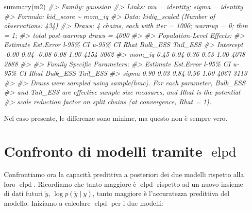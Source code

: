 \documentclass[
  10pt,
  italian,
  a4paper,
  extrafontsizes,onecolumn,openright
  ]{memoir}
\newenvironment{Shaded}{\begin{snugshade}}{\end{snugshade}}
\newcommand{\CommentTok}[1]{\textcolor[rgb]{0.56,0.35,0.01}{\textit{#1}}}
\newcommand{\FunctionTok}[1]{\textcolor[rgb]{0.00,0.00,0.00}{#1}}
\newcommand{\NormalTok}[1]{#1}
\DeclareMathOperator{\elpd}{elpd} %
\theoremstyle{definition}
\theoremstyle{definition}
\theoremstyle{definition}
\theoremstyle{definition}
\theoremstyle{remark}
\begin{document}
\begin{Shaded}
\begin{Highlighting}[]
\FunctionTok{summary}\NormalTok{(m2)}
\CommentTok{\#\textgreater{}  Family: gaussian }
\CommentTok{\#\textgreater{}   Links: mu = identity; sigma = identity }
\CommentTok{\#\textgreater{} Formula: kid\_score \textasciitilde{} mom\_iq }
\CommentTok{\#\textgreater{}    Data: kidiq\_scaled (Number of observations: 434) }
\CommentTok{\#\textgreater{}   Draws: 4 chains, each with iter = 1000; warmup = 0; thin = 1;}
\CommentTok{\#\textgreater{}          total post{-}warmup draws = 4000}
\CommentTok{\#\textgreater{} }
\CommentTok{\#\textgreater{} Population{-}Level Effects: }
\CommentTok{\#\textgreater{}           Estimate Est.Error l{-}95\% CI u{-}95\% CI Rhat Bulk\_ESS Tail\_ESS}
\CommentTok{\#\textgreater{} Intercept    {-}0.00      0.04    {-}0.08     0.08 1.00     4154     3062}
\CommentTok{\#\textgreater{} mom\_iq        0.45      0.04     0.36     0.53 1.00     4078     2888}
\CommentTok{\#\textgreater{} }
\CommentTok{\#\textgreater{} Family Specific Parameters: }
\CommentTok{\#\textgreater{}       Estimate Est.Error l{-}95\% CI u{-}95\% CI Rhat Bulk\_ESS Tail\_ESS}
\CommentTok{\#\textgreater{} sigma     0.90      0.03     0.84     0.96 1.00     4067     3113}
\CommentTok{\#\textgreater{} }
\CommentTok{\#\textgreater{} Draws were sampled using sample(hmc). For each parameter, Bulk\_ESS}
\CommentTok{\#\textgreater{} and Tail\_ESS are effective sample size measures, and Rhat is the potential}
\CommentTok{\#\textgreater{} scale reduction factor on split chains (at convergence, Rhat = 1).}
\end{Highlighting}
\end{Shaded}

\noindent
Nel caso presente, le differenze sono minime, ma questo non è sempre vero.

\hypertarget{confronto-di-modelli-tramite-elpd}{%
\section{\texorpdfstring{Confronto di modelli tramite \(\elpd\)}{Confronto di modelli tramite \textbackslash elpd}}\label{confronto-di-modelli-tramite-elpd}}

Confrontiamo ora la capacità predittiva a posteriori dei due modelli rispetto alla loro \(\elpd\). Ricordiamo che tanto maggiore è \(\elpd\) rispetto ad un nuovo insieme di dati futuri \(\tilde{y}\), \(\log p(\tilde{y} \mid y)\), tanto maggiore è l'accuratezza predittiva del modello. Iniziamo a calcolare \(\elpd\) per i due modelli:
\end{document}
